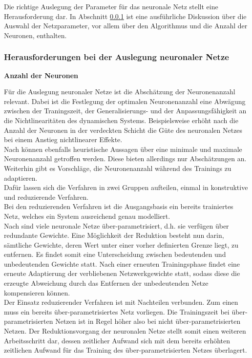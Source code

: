 Die richtige Auslegung der Parameter für das neuronale Netz stellt eine Herausforderung dar. In Abschnitt \ref{cha:ff_herausforderung} ist eine ausführliche Diskussion über die Auswahl der Netzparameter, vor allem über den Algorithmus und  die Anzahl der Neuronen, enthalten. \\ 

\subsubsection{Herausforderungen bei der Auslegung neuronaler Netze}
\label{cha:ff_herausforderung}

\textbf{Anzahl der Neuronen}

Für die Auslegung neuronaler Netze ist die Abschätzung der Neuronenanzahl relevant. Dabei ist die Festlegung der optimalen Neuronenanzahl eine Abwägung zwischen der Traningszeit, der Generalisierungs- und der Anpassungsfähigkeit an die Nichtlinearitäten des dynamischen Systems. Beispielsweise erhöht nach \cite{Fumumoto.2017} die Anzahl der Neuronen in der verdeckten Schicht die Güte des neuronalen Netzes bei einem Anstieg nichtlinearer Effekte. \\
Nach \cite{.2008} können ebenfalls heuristische Aussagen über eine minimale und maximale Neuronenanzahl getroffen werden. Diese bieten allerdings nur Abschätzungen an. Weiterhin gibt es Vorschläge, die Neuronenanzahl während des Trainings zu adaptieren.\\ 
Dafür lassen sich die Verfahren in zwei Gruppen aufteilen, einmal in konstruktive und reduzierende Verfahren. \\ 
Bei den reduzierenden Verfahren ist die Ausgangsbasis ein bereits trainiertes Netz, welches ein System ausreichend  genau modelliert. \\ 
Nach \cite{Han.682015} sind viele neuronale Netze über-parametrisiert, d.h. sie verfügen über redundante Gewichte. Eine Möglichkeit der Reduktion besteht nun darin, sämtliche Gewichte, deren Wert unter einer vorher definierten Grenze liegt, zu entfernen. Es findet somit eine Unterscheidung zwischen bedeutenden und unbedeutenden Gewichte statt. Nach einer erneuten Trainingsphase findet eine erneute Adaptierung der verbliebenen Netzwerkgewichte statt, sodass diese die erzeugte Abweichung durch das Entfernen der unbedeutenden Netze kompensieren können. \cite{Han.682015} \\
Der Einsatz reduzierender Verfahren ist mit Nachteilen verbunden. Zum einen muss ein bereits über-parametrisiertes Netz vorliegen. Die Trainingszeit bei über-parametrisierten Netzen ist in Regel höher also bei nicht über-parametrisierten Netzen. Der Reduktionsvorgang der neuronalen Netze stellt somit einen weiteren Arbeitsschritt dar, dessen zeitlicher Aufwand sich mit dem bereits erhöhten zeitlichen Aufwand für das Training des über-parametrisierten Netzes überlagert. \\

